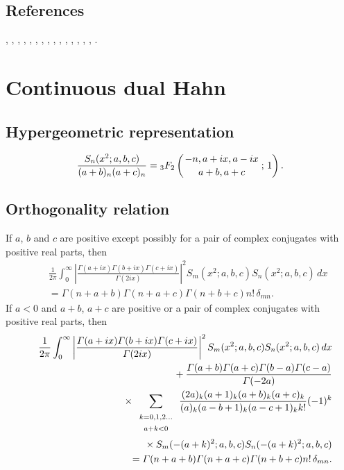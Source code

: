 \documentclass[envcountchap,graybox]{svmono}
\newcommand{\hyp}[5]{\mbox{}_{#1}{F}_{#2}
\left(\genfrac{}{}{0pt}{}{#3}{#4}\,;\,#5\right)}
\newcommand{\mathindent}{\hspace{7.5mm}}
\renewcommand{\Gamma}{\varGamma}
\begin{document}
\subsection*{References}
\cite{Askey89I}, \cite{AskeyWilson79}, \cite{AskeyWilson85},
\cite{AtakRahmanSuslov}, \cite{AtakSuslov88}, \cite{Dunkl84},
\cite{Koorn88}, \cite{Lesky93}, \cite{Lesky95II}, \cite{LeskyWaibel},
\cite{Nikiforov+}, \cite{NikiforovUvarov}, \cite{Perlstadt}, \cite{Rahman80}, 
\cite{Rahman81II}, \cite{Wilson80}.


\section{Continuous dual Hahn}

\par\setcounter{equation}{0}

\subsection*{Hypergeometric representation}
\begin{equation}
\label{DefContDualHahn}
\frac{S_n(x^2;a,b,c)}{(a+b)_n(a+c)_n}=\hyp{3}{2}{-n,a+ix,a-ix}{a+b,a+c}{1}.
\end{equation}

\subsection*{Orthogonality relation}
If $a$, $b$ and $c$ are positive except possibly for a pair of complex conjugates with positive real parts, then
\begin{eqnarray}
\label{OrtIContDualHahn}
& &\frac{1}{2\pi}\int_0^{\infty}\left|\frac{\Gamma(a+ix)\Gamma(b+ix)\Gamma(c+ix)}{\Gamma(2ix)}\right|^2
S_m(x^2;a,b,c)S_n(x^2;a,b,c)\,dx\nonumber\\
& &{}=\Gamma(n+a+b)\Gamma(n+a+c)\Gamma(n+b+c)n!\,\delta_{mn}.
\end{eqnarray}
If $a<0$ and $a+b$, $a+c$ are positive or a pair of complex conjugates
with positive real parts, then
\begin{eqnarray}
\label{OrtIIContDualHahn}
& &\frac{1}{2\pi}\int_0^{\infty}\left|\frac{\Gamma(a+ix)\Gamma(b+ix)\Gamma(c+ix)}{\Gamma(2ix)}\right|^2
S_m(x^2;a,b,c)S_n(x^2;a,b,c)\,dx\nonumber\\
& &{}\mathindent{}+\frac{\Gamma(a+b)\Gamma(a+c)\Gamma(b-a)\Gamma(c-a)}{\Gamma(-2a)}\nonumber\\
& &{}\mathindent\mathindent{}\times\sum_{\begin{array}{c}
{\scriptstyle k=0,1,2\ldots}\\{\scriptstyle a+k<0}\end{array}}
\frac{(2a)_k(a+1)_k(a+b)_k(a+c)_k}{(a)_k(a-b+1)_k(a-c+1)_kk!}(-1)^k\nonumber\\
& &{}\mathindent\mathindent\mathindent\mathindent{}\times S_m(-(a+k)^2;a,b,c)S_n(-(a+k)^2;a,b,c)\nonumber\\
& &{}=\Gamma(n+a+b)\Gamma(n+a+c)\Gamma(n+b+c)n!\,\delta_{mn}.
\end{eqnarray}
\end{document}
